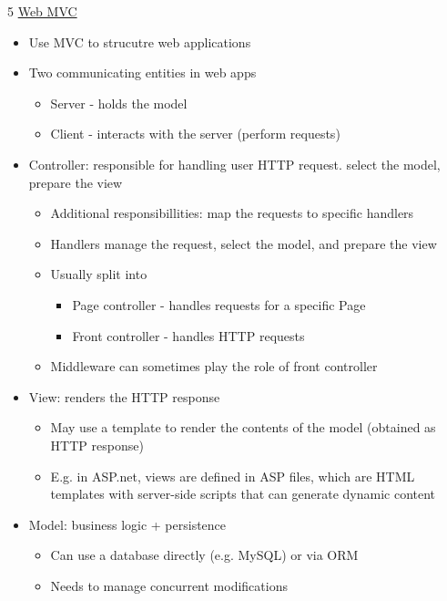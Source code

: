 \documentclass[landscape,a4paper]{extarticle}
\begin{document}
\begin{multicols*}{5}
    \uline{Web MVC}
    \begin{itemize}
        \item Use MVC to strucutre web applications
        \item Two communicating entities in web apps
        \begin{itemize}
            \item Server - holds the model
            \item Client - interacts with the server (perform requests)
        \end{itemize}
        \item Controller: responsible for handling user HTTP request. select the model, prepare the view
        \begin{itemize}
            \item Additional responsibillities: map the requests to specific handlers
            \item Handlers manage the request, select the model, and prepare the view
            \item Usually split into
            \begin{itemize}
                \item Page controller - handles requests for a specific Page
                \item Front controller - handles HTTP requests
            \end{itemize}
            \item Middleware can sometimes play the role of front controller
        \end{itemize}
        \item View: renders the HTTP response
        \begin{itemize}
            \item May use a template to render the contents of the model (obtained as HTTP response)
            \item E.g. in ASP.net, views are defined in ASP files, which are HTML templates with server-side scripts that can generate dynamic content
        \end{itemize}
        \item Model: business logic + persistence
        \begin{itemize}
            \item Can use a database directly (e.g. MySQL) or via ORM
            \item Needs to manage concurrent modifications
        \end{itemize}
    \end{itemize}


\end{multicols*}
\end{document}
